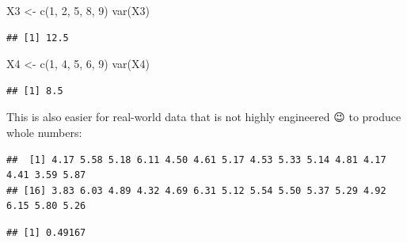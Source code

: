 \documentclass[
]{book}
\newenvironment{Shaded}{\begin{snugshade}}{\end{snugshade}}
\newcommand{\DecValTok}[1]{\textcolor[rgb]{0.00,0.00,0.81}{#1}}
\newcommand{\FunctionTok}[1]{\textcolor[rgb]{0.00,0.00,0.00}{#1}}
\newcommand{\NormalTok}[1]{#1}
\newcommand{\OtherTok}[1]{\textcolor[rgb]{0.56,0.35,0.01}{#1}}
\newcommand{\SpecialCharTok}[1]{\textcolor[rgb]{0.00,0.00,0.00}{#1}}
\begin{document}
\begin{Shaded}
\begin{Highlighting}[]
\NormalTok{X3 }\OtherTok{\textless{}{-}} \FunctionTok{c}\NormalTok{(}\DecValTok{1}\NormalTok{, }\DecValTok{2}\NormalTok{, }\DecValTok{5}\NormalTok{, }\DecValTok{8}\NormalTok{, }\DecValTok{9}\NormalTok{)}
\FunctionTok{var}\NormalTok{(X3)}
\end{Highlighting}
\end{Shaded}

\begin{verbatim}
## [1] 12.5
\end{verbatim}

\begin{Shaded}
\begin{Highlighting}[]
\NormalTok{X4 }\OtherTok{\textless{}{-}} \FunctionTok{c}\NormalTok{(}\DecValTok{1}\NormalTok{, }\DecValTok{4}\NormalTok{, }\DecValTok{5}\NormalTok{, }\DecValTok{6}\NormalTok{, }\DecValTok{9}\NormalTok{)}
\FunctionTok{var}\NormalTok{(X4)}
\end{Highlighting}
\end{Shaded}

\begin{verbatim}
## [1] 8.5
\end{verbatim}

This is also easier for real-world data that is not highly engineered 😉 to produce whole numbers:

\begin{Shaded}
\end{Shaded}

\begin{verbatim}
##  [1] 4.17 5.58 5.18 6.11 4.50 4.61 5.17 4.53 5.33 5.14 4.81 4.17 4.41 3.59 5.87
## [16] 3.83 6.03 4.89 4.32 4.69 6.31 5.12 5.54 5.50 5.37 5.29 4.92 6.15 5.80 5.26
\end{verbatim}

\begin{Shaded}
\end{Shaded}

\begin{verbatim}
## [1] 0.49167
\end{verbatim}
\end{document}
